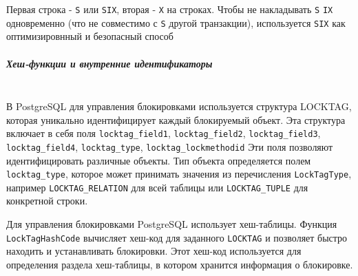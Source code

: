  Первая строка - \texttt{S} или \texttt{SIX}, вторая - \texttt{X} на строках. 
 Чтобы не накладывать \texttt{S} \+ \texttt{IX} одновременно (что не совместимо с \texttt{S} другой транзакции), используется \texttt{SIX} как оптимизировнный и безопасный способ

\subparagraph{Хеш-функции и внутренние идентификаторы} ~\\

 В PostgreSQL для управления блокировками используется структура LOCKTAG, которая уникально идентифицирует каждый блокируемый объект. Эта структура включает в себя поля \texttt{locktag\_field1}, \texttt{locktag\_field2}, \texttt{locktag\_field3}, \texttt{locktag\_field4}, \texttt{locktag\_type}, \texttt{locktag\_lockmethodid} \autocite{PostgreSQLlockh1, PostgreSQLlockh2}
 Эти поля позволяют идентифицировать различные объекты. Тип объекта определяется полем \texttt{locktag\_type}, которое может принимать значения из перечисления \texttt{LockTagType}, например \texttt{LOCKTAG\_RELATION} для всей таблицы или \texttt{LOCKTAG\_TUPLE} для конкретной строки.
 
 Для управления блокировками PostgreSQL использует хеш-таблицы. Функция \texttt{LockTagHashCode} вычисляет хеш-код для заданного \texttt{LOCKTAG} и позволяет быстро находить и устанавливать блокировки. Этот хеш-код используется для определения раздела хеш-таблицы, в котором хранится информация о блокировке. \autocite{PostgreSQLlockc1, PostgreSQLlockc2}


